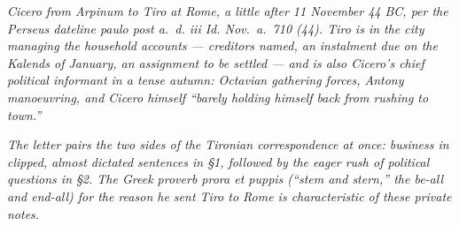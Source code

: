 
\textit{Cicero from Arpinum to Tiro at Rome, a little after 11
November 44 BC, per the Perseus dateline \textit{paulo post a.~d.
iii Id. Nov.~a.~710 (44)}. Tiro is in the city managing the
household accounts --- creditors named, an instalment due on the
Kalends of January, an assignment to be settled --- and is also
Cicero's chief political informant in a tense autumn: Octavian
gathering forces, Antony manoeuvring, and Cicero himself ``barely
holding himself back from rushing to town.''}

\textit{The letter pairs the two sides of the Tironian
correspondence at once: business in clipped, almost dictated
sentences in \S 1, followed by the eager rush of political
questions in \S 2. The Greek proverb \textit{prora et puppis}
(``stem and stern,'' the be-all and end-all) for the reason he
sent Tiro to Rome is characteristic of these private notes.}
